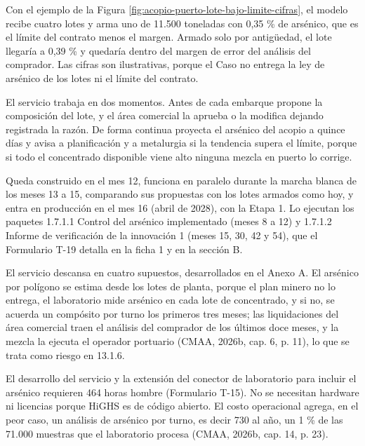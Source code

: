 \documentclass[subdoc]{../../comun/overfore}
\begin{document}
Con el ejemplo de la Figura \ref{fig:acopio-puerto-lote-bajo-limite-cifras}, el modelo recibe cuatro lotes y arma uno de 11.500 toneladas con 0,35 \% de arsénico, que es el límite del contrato menos el margen. Armado solo por antigüedad, el lote llegaría a 0,39 \% y quedaría dentro del margen de error del análisis del comprador. Las cifras son ilustrativas, porque el Caso no entrega la ley de arsénico de los lotes ni el límite del contrato.

El servicio trabaja en dos momentos. Antes de cada embarque propone la composición del lote, y el área comercial la aprueba o la modifica dejando registrada la razón. De forma continua proyecta el arsénico del acopio a quince días y avisa a planificación y a metalurgia si la tendencia supera el límite, porque si todo el concentrado disponible viene alto ninguna mezcla en puerto lo corrige.

Queda construido en el mes 12, funciona en paralelo durante la marcha blanca de los meses 13 a 15, comparando sus propuestas con los lotes armados como hoy, y entra en producción en el mes 16 (abril de 2028), con la Etapa 1. Lo ejecutan los paquetes 1.7.1.1 Control del arsénico implementado (meses 8 a 12) y 1.7.1.2 Informe de verificación de la innovación 1 (meses 15, 30, 42 y 54), que el Formulario T-19 detalla en la ficha 1 y en la sección B.

El servicio descansa en cuatro supuestos, desarrollados en el Anexo A. El arsénico por polígono se estima desde los lotes de planta, porque el plan minero no lo entrega, el laboratorio mide arsénico en cada lote de concentrado, y si no, se acuerda un compósito por turno los primeros tres meses; las liquidaciones del área comercial traen el análisis del comprador de los últimos doce meses, y la mezcla la ejecuta el operador portuario (CMAA, 2026b, cap. 6, p. 11), lo que se trata como riesgo en 13.1.6.

El desarrollo del servicio y la extensión del conector de laboratorio para incluir el arsénico requieren 464 horas hombre (Formulario T-15). No se necesitan hardware ni licencias porque HiGHS es de código abierto. El costo operacional agrega, en el peor caso, un análisis de arsénico por turno, es decir 730 al año, un 1 \% de las 71.000 muestras que el laboratorio procesa (CMAA, 2026b, cap. 14, p. 23).
\end{document}
